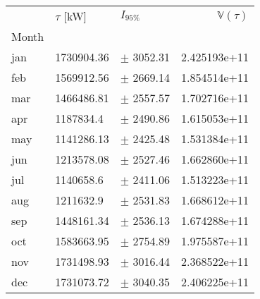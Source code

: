 \begin{tabular}{lllr}
\toprule
{} & $\tau$ [kW] &      $I_{95\%}$ &  $\mathbb{V}(\tau)$ \\
Month &             &                 &                     \\
\midrule
jan   &  1730904.36 &   $\pm$ 3052.31 &        2.425193e+11 \\
feb   &  1569912.56 &   $\pm$ 2669.14 &        1.854514e+11 \\
mar   &  1466486.81 &   $\pm$ 2557.57 &        1.702716e+11 \\
apr   &   1187834.4 &   $\pm$ 2490.86 &        1.615053e+11 \\
may   &  1141286.13 &   $\pm$ 2425.48 &        1.531384e+11 \\
jun   &  1213578.08 &   $\pm$ 2527.46 &        1.662860e+11 \\
jul   &   1140658.6 &   $\pm$ 2411.06 &        1.513223e+11 \\
aug   &   1211632.9 &   $\pm$ 2531.83 &        1.668612e+11 \\
sep   &  1448161.34 &   $\pm$ 2536.13 &        1.674288e+11 \\
oct   &  1583663.95 &   $\pm$ 2754.89 &        1.975587e+11 \\
nov   &  1731498.93 &   $\pm$ 3016.44 &        2.368522e+11 \\
dec   &  1731073.72 &   $\pm$ 3040.35 &        2.406225e+11 \\
\bottomrule
\end{tabular}
